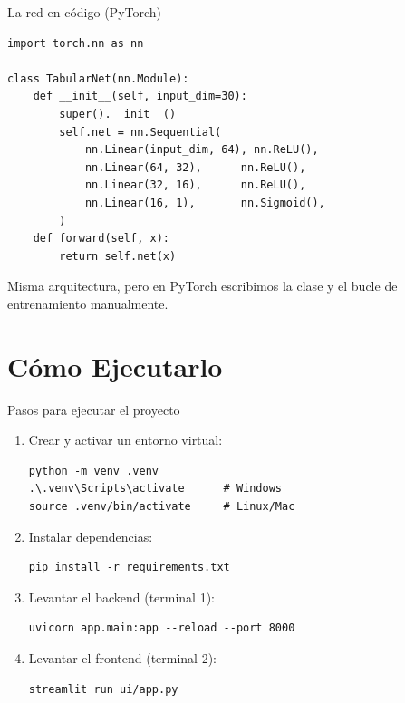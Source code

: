 \documentclass[10pt,aspectratio=169]{beamer}
\begin{document}
\begin{frame}[fragile]{La red en código (PyTorch)}
  \lstset{language=Python,basicstyle=\ttfamily\tiny}
  \begin{lstlisting}
import torch.nn as nn

class TabularNet(nn.Module):
    def __init__(self, input_dim=30):
        super().__init__()
        self.net = nn.Sequential(
            nn.Linear(input_dim, 64), nn.ReLU(),
            nn.Linear(64, 32),      nn.ReLU(),
            nn.Linear(32, 16),      nn.ReLU(),
            nn.Linear(16, 1),       nn.Sigmoid(),
        )
    def forward(self, x):
        return self.net(x)
  \end{lstlisting}
  \pause
  \begin{center}
    \small Misma arquitectura, pero en PyTorch escribimos la clase y el
    bucle de entrenamiento manualmente.
  \end{center}
\end{frame}

\section{Cómo Ejecutarlo}

\begin{frame}[fragile]{Pasos para ejecutar el proyecto}
  \begin{enumerate}
    \item Crear y activar un entorno virtual:
      \lstset{language=bash,basicstyle=\ttfamily\tiny}
      \begin{lstlisting}
python -m venv .venv
.\.venv\Scripts\activate      # Windows
source .venv/bin/activate     # Linux/Mac
      \end{lstlisting}
    \pause
    \item Instalar dependencias:
      \begin{lstlisting}
pip install -r requirements.txt
      \end{lstlisting}
    \pause
    \item Levantar el backend (terminal 1):
      \begin{lstlisting}
uvicorn app.main:app --reload --port 8000
      \end{lstlisting}
    \pause
    \item Levantar el frontend (terminal 2):
      \begin{lstlisting}
streamlit run ui/app.py
      \end{lstlisting}
  \end{enumerate}
\end{frame}
\end{document}

